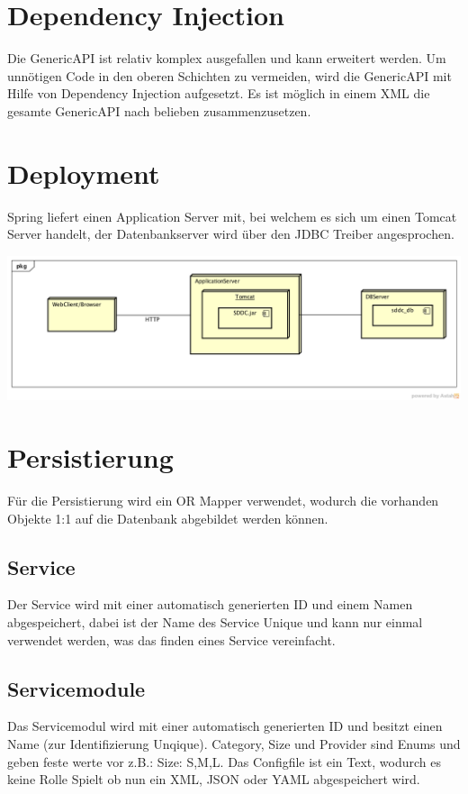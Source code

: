 \section{Dependency Injection}

Die GenericAPI ist relativ komplex ausgefallen und kann erweitert werden. Um unnötigen 
Code in den oberen Schichten zu vermeiden, wird die GenericAPI mit Hilfe von Dependency
 Injection aufgesetzt. Es ist möglich in einem XML die gesamte GenericAPI nach belieben zusammenzusetzen.

\section{Deployment}

Spring liefert einen Application Server mit, bei welchem es sich um einen Tomcat 
Server handelt, der Datenbankserver wird über den JDBC Treiber angesprochen.

\includegraphics[width=\textwidth]{./05_Design/04_Architektur/deployment}

\section{Persistierung}
Für die Persistierung wird ein OR Mapper verwendet, wodurch die vorhanden 
Objekte 1:1 auf die Datenbank abgebildet werden können.

\subsection{Service}
Der Service wird mit einer automatisch generierten ID und einem Namen 
abgespeichert, dabei ist der Name des Service Unique und kann nur einmal 
verwendet werden, was das finden eines Service vereinfacht.

\subsection{Servicemodule}
Das Servicemodul wird mit einer automatisch generierten ID und besitzt einen 
Name (zur Identifizierung Unqique).
Category, Size und Provider sind Enums und geben feste werte vor z.B.: Size: 
S,M,L.
Das Configfile ist ein Text, wodurch es keine Rolle Spielt ob nun ein XML, JSON 
oder YAML abgespeichert wird.

